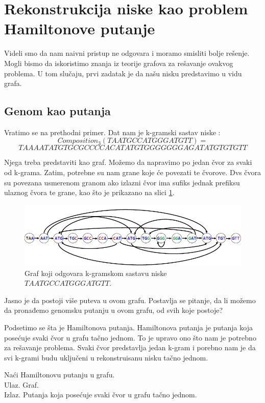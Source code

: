 \section{Rekonstrukcija niske kao problem Hamiltonove putanje}

Videli smo da nam naivni pristup ne odgovara i moramo smisliti bolje rešenje. Mogli bismo da iskoristimo znanja iz teorije grafova za rešavanje ovakvog problema. U tom slučaju, prvi zadatak je da našu nisku predstavimo u vidu grafa.


\subsection{Genom kao putanja}

Vratimo se na prethodni primer. Dat nam je k-gramski sastav niske :
$$Composition_3(TAATGCCATGGGATGTT) =$$
$$ TAA AAT ATG TGC GCC CCA CAT ATG TGG GGG GGA GAT ATG TGT GTT$$

Njega treba predstaviti kao graf. Možemo da napravimo po jedan čvor za svaki od k-grama. Zatim, potrebne su nam grane koje će povezati te čvorove. Dvs čvora su povezana usmerenom granom ako izlazni čvor ima sufiks jednak prefiksu ulaznog čvora te grane, kao što je prikazano na slici \ref{slika:graf1}.

\begin{figure}[H]
	\centering
	\includegraphics[width=1\textwidth]{poglavlja/3/slike/graf1.png}
	\caption{Graf koji odgovara k-gramskom sastavu niske $TAATGCCATGGGATGTT$.}
	\label{slika:graf1}
\end{figure} 

Jasno je da postoji više puteva u ovom grafu. Postavlja se pitanje, da li možemo da pronađemo genomsku putanju u ovom grafu, od svih koje postoje?

Podsetimo se šta je Hamiltonova putanja. Hamiltonova putanja je putanja koja posećuje svaki čvor u grafu tačno jednom. To je upravo ono što nam je potrebno za rešavanje problema. Svaki čvor predstavlja jedan k-gram i porebno nam je da svi k-grami budu uključeni u rekonstruisanu nisku tačno jednom.

\begin{problem}
	Naći Hamiltonovu putanju u grafu.
	\\ Ulaz. Graf.
	\\Izlaz. Putanja koja posećuje svaki čvor u grafu tačno jednom.
\end{problem}

